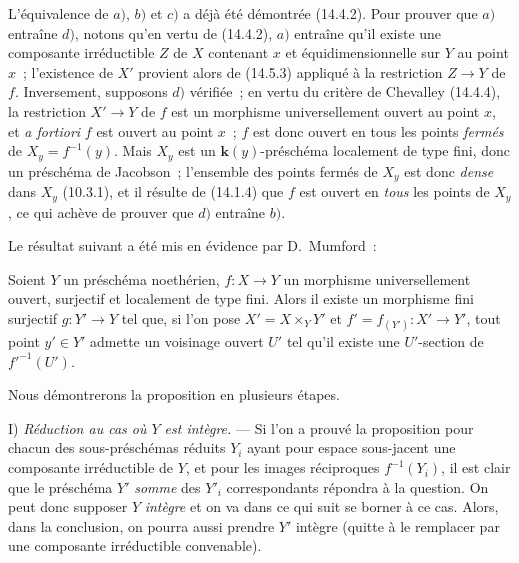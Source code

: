 L'équivalence de $a)$, $b)$ et $c)$ a déjà été démontrée (14.4.2). Pour prouver
que $a)$ entraîne $d)$, notons qu'en vertu de (14.4.2), $a)$ entraîne qu'il existe
une composante irréductible $Z$ de $X$ contenant $x$ et équidimensionnelle sur $Y$
au point $x$~; l'existence de $X'$ provient alors de (14.5.3) appliqué à la
restriction $Z\to Y$ de $f$. Inversement, supposons $d)$ vérifiée~; en vertu du
critère de Chevalley (14.4.4), la restriction $X'\to Y$ de $f$ est un morphisme
universellement ouvert au point $x$, et \emph{a fortiori} $f$ est ouvert au point $x$~;
$f$ est donc ouvert en tous les points \emph{fermés} de $X_y=f^{-1}(y)$. Mais $X_y$ est
un $\boldsymbol{k}(y)$-préschéma localement de type fini, donc un préschéma de Jacobson~;
l'ensemble des points fermés de $X_y$ est donc \emph{dense} dans $X_y$ (10.3.1),
et il résulte de (14.1.4) que $f$ est ouvert en \emph{tous} les points de $X_y$, ce
qui achève de prouver que $d)$ entraîne $b)$.

Le résultat suivant a été mis en évidence par D.~Mumford~:

\begin{proposition}[14.5.10]
\label{IV.14.5.10-fr}
Soient $Y$ un préschéma noethérien, $f:X\to Y$ un morphisme universellement ouvert,
surjectif et localement de type fini. Alors il existe un morphisme fini surjectif
$g:Y'\to Y$ tel que, si l'on pose $X'=X\times_Y Y'$ et
$f'=f_{(Y')}:X'\to Y'$, tout point $y'\in Y'$ admette un voisinage ouvert $U'$ tel
qu'il existe une $U'$-section de $f'^{-1}(U')$.
\end{proposition}

Nous démontrerons la proposition en plusieurs étapes.


I) \emph{Réduction au cas où $Y$ est intègre.} --- Si l'on a prouvé la proposition
pour chacun des sous-préschémas réduits $Y_i$ ayant pour espace sous-jacent une
composante irréductible de $Y$, et pour les images réciproques $f^{-1}(Y_i)$, il est
clair que le préschéma $Y'$ \emph{somme} des $Y'_i$ correspondants répondra à la
question. On peut donc supposer $Y$ \emph{intègre} et on va dans ce qui suit se
borner à ce cas. Alors, dans la conclusion, on pourra aussi prendre $Y'$ intègre
(quitte à le remplacer par une composante irréductible convenable).

